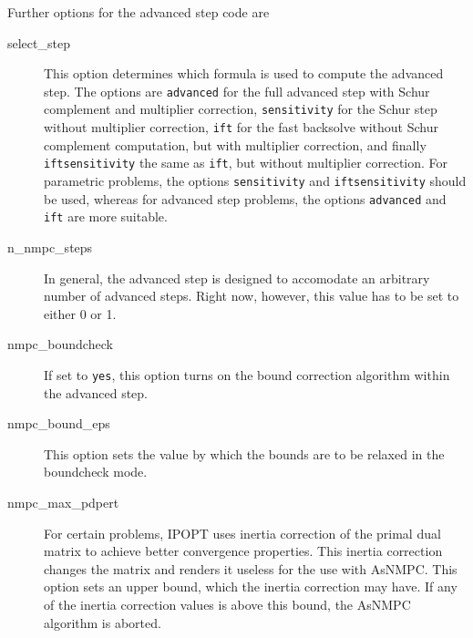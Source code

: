 \documentclass[a4paper]{article}
\begin{document}
Further options for the advanced step code are
\begin{description}
\item[select\_step] This option determines which formula is used to compute the advanced step. The options are \texttt{advanced} for the full advanced step with Schur complement and multiplier correction, \texttt{sensitivity} for the Schur step without multiplier correction, \texttt{ift} for the fast backsolve without Schur complement computation, but with multiplier correction, and finally \texttt{iftsensitivity} the same as \texttt{ift}, but without multiplier correction. For parametric problems, the options \texttt{sensitivity} and \texttt{iftsensitivity} should be used, whereas for advanced step problems, the options \texttt{advanced} and \texttt{ift} are more suitable.
\item[n\_nmpc\_steps] In general, the advanced step is designed to accomodate an arbitrary number of advanced steps. Right now, however, this value has to be set to either 0 or 1.
\item[nmpc\_boundcheck] If set to \texttt{yes}, this option turns on the bound correction algorithm within the advanced step. 
\item[nmpc\_bound\_eps] This option sets the value by which the bounds are to be relaxed in the boundcheck mode. 
\item[nmpc\_max\_pdpert] For certain problems, IPOPT uses inertia correction of the primal dual matrix to achieve better convergence properties. This inertia correction changes the matrix and renders it useless for the use with AsNMPC. This option sets an upper bound, which the inertia correction may have. If any of the inertia correction values is above this bound, the AsNMPC algorithm is aborted.
\end{description}


\end{document}
